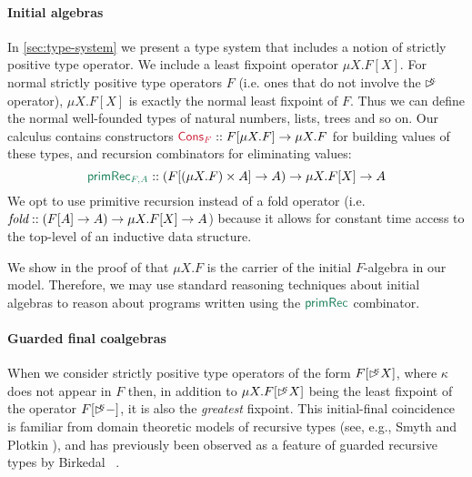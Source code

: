 \paragraph{Initial algebras}
In \autoref{sec:type-system} we present a type system that includes a
notion of strictly positive type operator. We include a least fixpoint
operator $\mu X. F[X]$. For normal strictly positive type operators
$F$ (i.e. ones that do not involve the $\mathord{\rhd\kern-0.4em^{\kappa}}$ operator), $\mu
X. F[X]$ is exactly the normal least fixpoint of $F$. Thus we can
define the normal well-founded types of natural numbers, lists, trees
and so on. Our calculus contains constructors $\cons{Cons$_F$} ::
F[\mu X. F] \to \mu X. F$ for building values of these types, and
recursion combinators for eliminating values:
\begin{displaymath}
  \elim{primRec$_{F,A}$} :: (F[(\mu X. F) \times A] \to A) \to \mu X. F[X] \to A 
\end{displaymath}
We opt to use primitive recursion instead of a fold operator
(i.e. $\textit{fold} :: (F[A] \to A) \to \mu X. F[X] \to A$) because
it allows for constant time access to the top-level of an inductive
data structure.

We show in the proof of  that $\mu X. F$
is the carrier of the initial $F$-algebra in our model. Therefore, we
may use standard reasoning techniques about initial algebras to reason
about programs written using the $\elim{primRec}$ combinator.

\paragraph{Guarded final coalgebras}
When we consider strictly positive type operators of the form
$F[\mathord{\rhd\kern-0.4em^{\kappa}} X]$, where $\kappa$ does not appear in $F$ then, in
addition to $\mu X. F[\mathord{\rhd\kern-0.4em^{\kappa}} X]$ being the least fixpoint of the
operator $F[\mathord{\rhd\kern-0.4em^{\kappa}} -]$, it is also the \emph{greatest}
fixpoint. This initial-final coincidence is familiar from domain
theoretic models of recursive types (see, e.g., Smyth and Plotkin
\cite{smyth82category}), and has previously been observed as a
feature of guarded recursive types by Birkedal
\etal~\cite{birkedal12first}.

